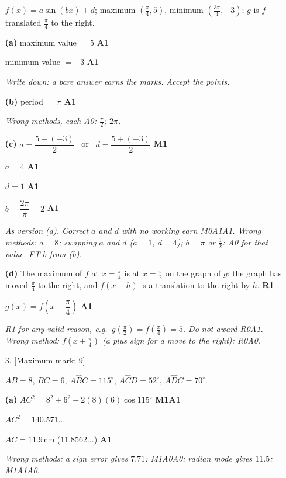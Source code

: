 \documentclass[12pt, twoside]{article}
\begin{document}
\begin{enumerate}[itemsep=0.3cm]
$f(x) = a\sin(bx) + d$; maximum $\left(\frac{\pi}{4}, 5\right)$, minimum
$\left(\frac{3\pi}{4}, -3\right)$; $g$ is $f$ translated $\frac{\pi}{4}$ to
the right.

\textbf{(a)} maximum value $= 5$ \hfill \textbf{A1}

minimum value $= -3$ \hfill \textbf{A1}

\emph{Write down: a bare answer earns the marks. Accept the points.}

\textbf{(b)} period $= \pi$ \hfill \textbf{A1}

\emph{Wrong methods, each A0: $\frac{\pi}{2}$; $2\pi$.}

\textbf{(c)} $a = \dfrac{5 - (-3)}{2}$ \ or \ $d = \dfrac{5 + (-3)}{2}$
\hfill \textbf{M1}

$a = 4$ \hfill \textbf{A1}

$d = 1$ \hfill \textbf{A1}

$b = \dfrac{2\pi}{\pi} = 2$ \hfill \textbf{A1}

\emph{As version (a). Correct $a$ and $d$ with no working earn M0A1A1.
Wrong methods: $a = 8$; swapping $a$ and $d$ ($a = 1$, $d = 4$);
$b = \pi$ or $\frac{1}{2}$: A0 for that value. FT $b$ from (b).}

\textbf{(d)} The maximum of $f$ at $x = \frac{\pi}{4}$ is at
$x = \frac{\pi}{2}$ on the graph of $g$: the graph has moved $\frac{\pi}{4}$
to the right, and $f(x - h)$ is a translation to the right by $h$.
\hfill \textbf{R1}

$g(x) = f\!\left(x - \dfrac{\pi}{4}\right)$ \hfill \textbf{A1}

\emph{R1 for any valid reason, e.g.\ $g\!\left(\frac{\pi}{2}\right) =
f\!\left(\frac{\pi}{4}\right) = 5$. Do not award R0A1. Wrong method:
$f\!\left(x + \frac{\pi}{4}\right)$ (a plus sign for a move to the right):
R0A0.}

\newpage

\item[3.] [Maximum mark: 9]

$AB = 8$, $BC = 6$, $A\hat{B}C = 115^\circ$; $A\hat{C}D = 52^\circ$,
$A\hat{D}C = 70^\circ$.

\textbf{(a)} $AC^{2} = 8^{2} + 6^{2} - 2(8)(6)\cos 115^\circ$
\hfill \textbf{M1A1}

$AC^{2} = 140.571\ldots$

$AC = 11.9\,\text{cm}$ \quad ($11.8562\ldots$) \hfill \textbf{A1}

\emph{Wrong methods: a sign error gives $7.71$: M1A0A0; radian mode gives
$11.5$: M1A1A0.}


\end{enumerate}
\end{document}
